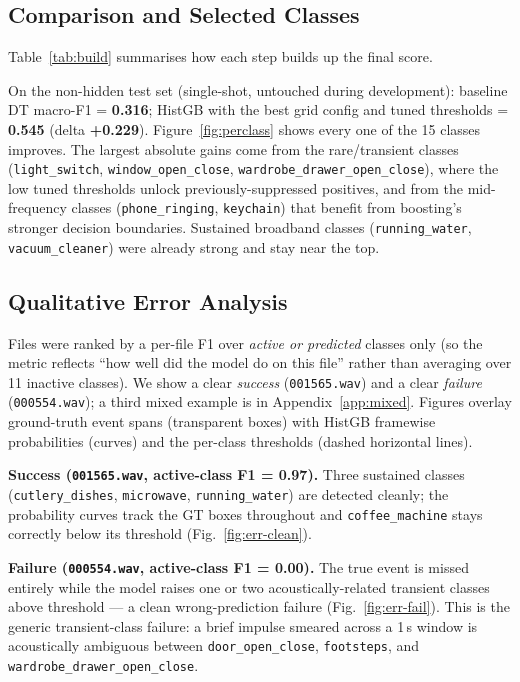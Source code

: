 \documentclass{article}
\begin{document}
\subsection{Comparison and Selected Classes}
Table~\ref{tab:build} summarises how each step builds up the final score.


On the non-hidden test set (single-shot, untouched during development):
baseline DT macro-F1 = \textbf{0.316}; HistGB with the best grid config
and tuned thresholds = \textbf{0.545} (delta \textbf{+0.229}).
Figure~\ref{fig:perclass} shows every one of the 15 classes improves.
The largest absolute gains come from the rare/transient classes
(\texttt{light\_switch}, \texttt{window\_open\_close},
\texttt{wardrobe\_drawer\_open\_close}), where the low tuned thresholds
unlock previously-suppressed positives, and from the mid-frequency
classes (\texttt{phone\_ringing}, \texttt{keychain}) that benefit from
boosting's stronger decision boundaries. Sustained broadband classes
(\texttt{running\_water}, \texttt{vacuum\_cleaner}) were already strong
and stay near the top.

\subsection{Qualitative Error Analysis}
Files were ranked by a per-file F1 over \emph{active or predicted}
classes only (so the metric reflects ``how well did the model do on this
file'' rather than averaging over 11 inactive classes). We show a clear
\emph{success} (\texttt{001565.wav}) and a clear \emph{failure}
(\texttt{000554.wav}); a third mixed example is in
Appendix~\ref{app:mixed}. Figures overlay ground-truth event spans
(transparent boxes) with HistGB framewise probabilities (curves) and the
per-class thresholds (dashed horizontal lines).

\textbf{Success (\texttt{001565.wav}, active-class F1 = 0.97).} Three
sustained classes (\texttt{cutlery\_dishes}, \texttt{microwave},
\texttt{running\_water}) are detected cleanly; the probability curves
track the GT boxes throughout and \texttt{coffee\_machine} stays
correctly below its threshold (Fig.~\ref{fig:err-clean}).

\textbf{Failure (\texttt{000554.wav}, active-class F1 = 0.00).} The true
event is missed entirely while the model raises one or two
acoustically-related transient classes above threshold ---
a clean wrong-prediction failure (Fig.~\ref{fig:err-fail}). This is the
generic transient-class failure: a brief impulse smeared across a 1\,s
window is acoustically ambiguous between
\texttt{door\_open\_close}, \texttt{footsteps}, and
\texttt{wardrobe\_drawer\_open\_close}.
\end{document}
